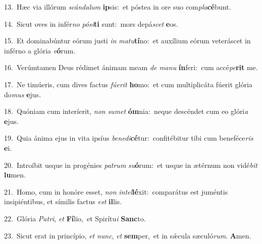 {\numbfont\textcolor{\numbcolor}{13.}}~Hæc via illórum \textit{scán}\-\textit{da}\textit{lum} \textbf{ip}\-sis:~\star et póstea in ore suo com\-\textit{pla}\-\textbf{cé}bunt.\par
{\numbfont\textcolor{\numbcolor}{14.}}~Sicut oves in infér\textit{no} \textit{pó}\-\textit{si}\textbf{ti} sunt:~\star mors depá\textit{scet} \textbf{e}\-os.\par
{\numbfont\textcolor{\numbcolor}{15.}}~Et dominabúntur eórum justi \textit{in} \textit{ma}\-\textit{tu}\textbf{tí}no:~\star et auxílium eórum veteráscet in inférno a glória \textit{e}\-\textbf{ó}rum.\par
{\numbfont\textcolor{\numbcolor}{16.}}~Verúmtamen Deus rédimet ánimam meam \textit{de} \textit{ma}\-\textit{nu} \textbf{ín}\-feri:~\star cum accé\-\textit{pe}\-\textbf{rit} me.\par
{\numbfont\textcolor{\numbcolor}{17.}}~Ne timúeris, cum dives factus \textit{fú}\-\textit{e}\textit{rit} \textbf{ho}\-mo:~\star et cum multiplicáta fúerit glória do\textit{mus} \textbf{e}\-jus.\par
{\numbfont\textcolor{\numbcolor}{18.}}~Quóniam cum interíerit, \textit{non} \textit{su}\-\textit{met} \textbf{óm}\-nia:~\star neque descéndet cum eo glóri\textit{a} \textbf{e}\-jus.\par
{\numbfont\textcolor{\numbcolor}{19.}}~Quia ánima ejus in vita ipsíus \textit{be}\-\textit{ne}\textit{di}\textbf{cé}tur:~\star confitébitur tibi cum beneféce\textit{ris} \textbf{e}\-i.\par
{\numbfont\textcolor{\numbcolor}{20.}}~Introíbit usque in progénies \textit{pa}\-\textit{trum} \textit{su}\-\textbf{ó}rum:~\star et usque in ætérnum non vidé\textit{bit} \textbf{lu}\-men.\par
{\numbfont\textcolor{\numbcolor}{21.}}~Homo, cum in honóre esset, \textit{non} \textit{in}\-\textit{tel}\textbf{lé}xit:~\star comparátus est juméntis insipiéntibus, et símilis factus \textit{est} \textbf{il}\-lis.\par
{\numbfont\textcolor{\numbcolor}{22.}}~Glória \textit{Pa}\-\textit{tri}, \textit{et} \textbf{Fí}\-lio,~\star et Spirítu\textit{i} \textbf{Sanc}\-to.\par
{\numbfont\textcolor{\numbcolor}{23.}}~Sicut erat in princípio, \textit{et} \textit{nunc}\-, \textit{et} \textbf{sem}\-per,~\star et in sǽcula sæculó\-\textit{rum}\-. \textbf{A}\-men.\par
